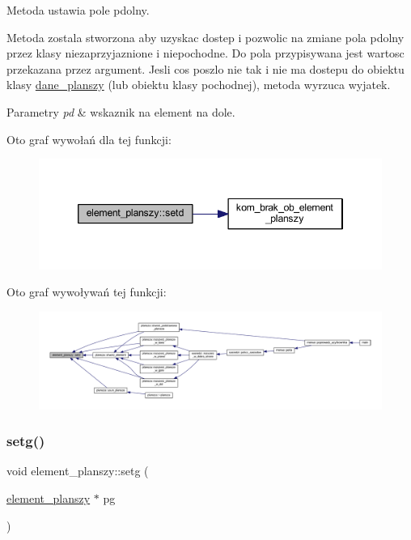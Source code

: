 Metoda ustawia pole pdolny.

Metoda zostala stworzona aby uzyskac dostep i pozwolic na zmiane pola pdolny przez klasy niezaprzyjaznione i niepochodne. Do pola przypisywana jest wartosc przekazana przez argument. Jesli cos poszlo nie tak i nie ma dostepu do obiektu klasy \mbox{\hyperlink{classdane__planszy}{dane\+\_\+planszy}} (lub obiektu klasy pochodnej), metoda wyrzuca wyjatek. 
\begin{DoxyParams}{Parametry}
{\em pd} & wskaznik na element na dole. \\
\hline
\end{DoxyParams}
Oto graf wywołań dla tej funkcji\+:
\nopagebreak
\begin{figure}[H]
\begin{center}
\leavevmode
\includegraphics[width=346pt]{classelement__planszy_a6f76a013512cd1d2e3f9c1785217c58d_cgraph}
\end{center}
\end{figure}
Oto graf wywoływań tej funkcji\+:
\nopagebreak
\begin{figure}[H]
\begin{center}
\leavevmode
\includegraphics[width=350pt]{classelement__planszy_a6f76a013512cd1d2e3f9c1785217c58d_icgraph}
\end{center}
\end{figure}
\mbox{\label{classelement__planszy_a77643f3091a8ee85206c4afc9b27c0c2}} 
\subsubsection{\texorpdfstring{setg()}{setg()}}
{\footnotesize\ttfamily void element\+\_\+planszy\+::setg (\begin{DoxyParamCaption}\item[{\mbox{\hyperlink{classelement__planszy}{element\+\_\+planszy}} $\ast$}]{pg }\end{DoxyParamCaption})}

